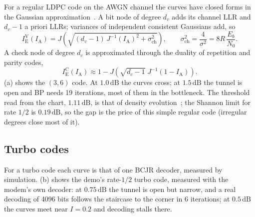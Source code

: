 \documentclass[11pt,a4paper]{article}
\newcommand{\dB}{\,\mathrm{dB}}
\newcommand{\IA}{I_{\mathrm{A}}}
\newcommand{\IE}{I_{\mathrm{E}}}
\theoremstyle{definition}
\theoremstyle{remark}
\begin{document}
For a regular LDPC code on the AWGN channel the curves have closed forms in the Gaussian approximation~\cite{tenbrinkldpc}. A bit node of degree $d_v$ adds its channel LLR and $d_v-1$ a priori LLRs; variances of independent consistent Gaussians add, so
\begin{equation}
  \IE^{\mathrm{V}}(\IA) = J\!\left(\sqrt{(d_v-1)\,J^{-1}(\IA)^2 + \sigma_{\mathrm{ch}}^2}\right),\qquad \sigma_{\mathrm{ch}}^2 = \frac{4}{\sigma^2} = 8R\,\frac{E_b}{N_0}.
  \label{eq:vnd}
\end{equation}
A check node of degree $d_c$ is approximated through the duality of repetition and parity codes,
\begin{equation}
  \IE^{\mathrm{C}}(\IA) \approx 1 - J\!\left(\sqrt{d_c-1}\;J^{-1}(1-\IA)\right).
  \label{eq:cnd}
\end{equation}
(a) shows the $(3,6)$ code. At $1.0\dB$ the curves cross; at $1.5\dB$ the tunnel is open and BP needs 19 iterations, most of them in the bottleneck. The threshold read from the chart, $1.11\dB$, is that of density evolution~\cite{richardson}; the Shannon limit for rate $1/2$ is $0.19\dB$, so the gap is the price of this simple regular code (irregular degrees close most of it).

\subsection{Turbo codes}

For a turbo code each curve is that of one BCJR decoder, measured by simulation. (b) shows the demo's rate-$1/2$ turbo code, measured with the modem's own decoder: at $0.75\dB$ the tunnel is open but narrow, and a real decoding of 4096 bits follows the staircase to the corner in 6 iterations; at $0.5\dB$ the curves meet near $I = 0.2$ and decoding stalls there.
\end{document}
